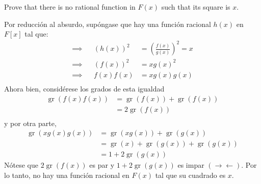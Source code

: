 \begin{problema}[Problema 4]
    Prove that there is no rational function in $F(x)$ such that its square is $x$.
    \begin{dem}
        Por reducción al absurdo, supóngase que hay una función racional $h(x)$ en $F[x]$ tal que:
        \begin{align*}
            \implies & &\left(h(x)\right)^2&=\left(\frac{f(x)}{g(x)}\right)^2 = x\\
            \implies & & (f(x))^2 &= xg(x)^2\\
            \implies & & f(x)f(x) &= xg(x)g(x)\\
        \end{align*}
        Ahora bien, considérese los grados de esta igualdad
        \begin{align*}
            \operatorname{gr}(f(x)f(x)) &= \operatorname{gr}(f(x))+\operatorname{gr}(f(x))\\
            &= 2\operatorname{gr}(f(x))\\
        \end{align*}
        y por otra parte,
        \begin{align*}
            \operatorname{gr}(xg(x)g(x)) &= \operatorname{gr}(xg(x))+\operatorname{gr}(g(x))\\
            &=\operatorname{gr}(x)+\operatorname{gr}(g(x))+\operatorname{gr}(g(x))\\
            &= 1+ 2\operatorname{gr}(g(x))
        \end{align*}
        Nótese que $2\operatorname{gr}(f(x))$ es par y $1+ 2\operatorname{gr}(g(x))$ es impar $(\to\gets)$. Por lo tanto, no hay una función racional en $F(x)$ tal que su cuadrado es $x$. 
    \end{dem}
\end{problema}

